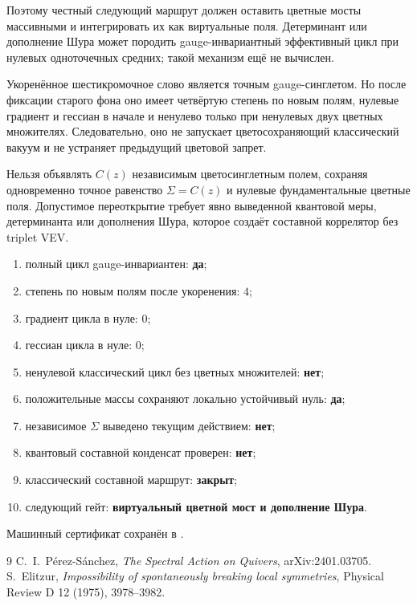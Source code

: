 Поэтому честный следующий маршрут должен оставить цветные мосты массивными
и интегрировать их как виртуальные поля. Детерминант или дополнение Шура
может породить gauge-инвариантный эффективный цикл при нулевых одноточечных
средних; такой механизм ещё не вычислен.

\begin{theorem}
Укоренённое шестикромочное слово является точным gauge-синглетом. Но после
фиксации старого фона оно имеет четвёртую степень по новым полям, нулевые
градиент и гессиан в начале и ненулево только при ненулевых двух цветных
множителях. Следовательно, оно не запускает цветосохраняющий классический
вакуум и не устраняет предыдущий цветовой запрет.
\end{theorem}

\begin{nogocriterion}
Нельзя объявлять $C(z)$ независимым цветосинглетным полем, сохраняя
одновременно точное равенство $\Sigma=C(z)$ и нулевые фундаментальные
цветные поля. Допустимое переоткрытие требует явно выведенной квантовой
меры, детерминанта или дополнения Шура, которое создаёт составной коррелятор
без triplet VEV.
\end{nogocriterion}

\begin{protocol}
\begin{enumerate}
 \item полный цикл gauge-инвариантен: \textbf{да};
 \item степень по новым полям после укоренения: \textbf{$4$};
 \item градиент цикла в нуле: \textbf{$0$};
 \item гессиан цикла в нуле: \textbf{$0$};
 \item ненулевой классический цикл без цветных множителей: \textbf{нет};
 \item положительные массы сохраняют локально устойчивый нуль: \textbf{да};
 \item независимое $\Sigma$ выведено текущим действием: \textbf{нет};
 \item квантовый составной конденсат проверен: \textbf{нет};
 \item классический составной маршрут: \textbf{закрыт};
 \item следующий гейт: \textbf{виртуальный цветной мост и дополнение Шура}.
\end{enumerate}
\end{protocol}

Машинный сертификат сохранён в
.

\begin{thebibliography}{9}
C.~I.~P\'erez-S\'anchez,
\emph{The Spectral Action on Quivers}, arXiv:2401.03705.
S.~Elitzur,
\emph{Impossibility of spontaneously breaking local symmetries},
Physical Review D 12 (1975), 3978--3982.
\end{thebibliography}